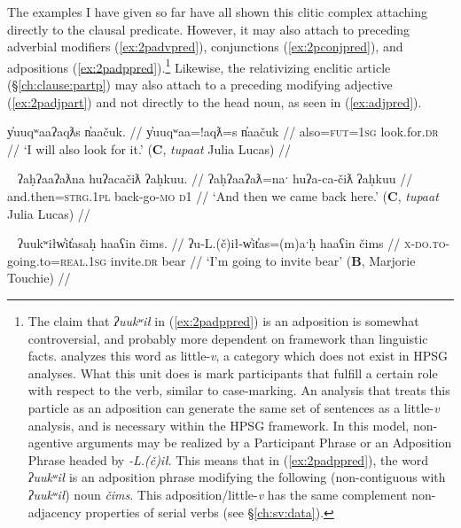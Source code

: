 The examples I have given so far have all shown this clitic complex attaching directly to the clausal predicate. However, it may also attach to preceding adverbial modifiers (\ref{ex:2padvpred}), conjunctions (\ref{ex:2pconjpred}), and adpositions (\ref{ex:2padppred}).\footnote{The claim that \textit{ʔuukʷił} in (\ref{ex:2padppred}) is an adposition is somewhat controversial, and probably more dependent on framework than linguistic facts. \citet{woo2007b} analyzes this word as little-\textit{v}, a category which does not exist in HPSG analyses. What this unit does is mark participants that fulfill a certain role with respect to the verb, similar to case-marking. An analysis that treats this particle as an adposition can generate the same set of sentences as a little-\textit{v} analysis, and is necessary within the HPSG framework. In this model, non-agentive arguments may be realized by a Participant Phrase or an Adposition Phrase headed by \textit{-L.(č)ił}. This means that in (\ref{ex:2padppred}), the word \textit{ʔuukʷił} is an adposition phrase modifying the following (non-contiguous with \textit{ʔuukʷił}) noun \textit{čims}. This adposition/little-\textit{v} has the same complement non-adjacency properties of serial verbs (see \S\ref{ch:sv:data}).} Likewise, the relativizing enclitic article (\S\ref{ch:clause:partp}) may also attach to a preceding modifying adjective (\ref{ex:2padjpart}) and not directly to the head noun, as seen in (\ref{ex:adjpred}).

\ex \label{ex:2padvpred}
\begingl
\glpreamble y̓uuqʷaaʔaqƛs n̓aačuk. //
\gla y̓uuqʷaa=!aqƛ=s n̓aačuk  //
\glb also=\textsc{fut}=\textsc{1sg} look.for.\textsc{dr} //
\glft `I will also look for it.' (\textbf{C}, \textit{tupaat} Julia Lucas) //
\endgl
\xe

\ex~ \label{ex:2pconjpred}
\begingl
\glpreamble ʔaḥʔaaʔaƛna huʔacačiƛ ʔaḥkuu. //
\gla ʔaḥʔaaʔaƛ=naˑ huʔa-ca-čiƛ ʔaḥkuu  //
\glb and.then=\textsc{strg.1pl} back-go-\textsc{mo} \textsc{d1} //
\glft `And then we came back here.' (\textbf{C}, \textit{tupaat} Julia Lucas) //
\endgl
\xe


\ex~ \label{ex:2padppred}
\begingl
\glpreamble ʔuukʷiłw̓it̓asaḥ haaʕin čims. //
\gla ʔu-L.(č)ił-w̓it̓as=(m)aˑḥ haaʕin čims  //
\glb \textsc{x}-\textsc{do.to}-going.to=\textsc{real.1sg} invite.\textsc{dr} bear //
\glft `I'm going to invite bear' (\textbf{B}, Marjorie Touchie) //
\endgl
\xe

